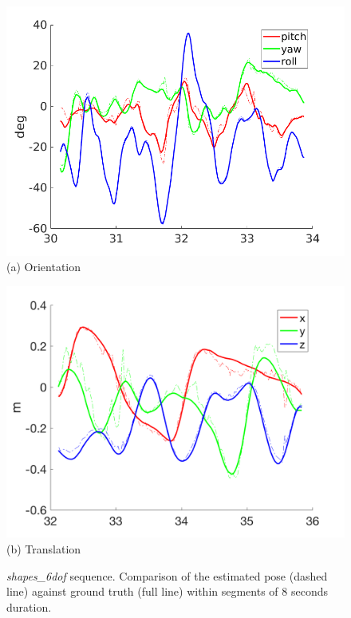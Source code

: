 \begin{figure}
  \begin{minipage}[t]{0.48\textwidth}
    \centering \includegraphics[width =
    \textwidth]{images/shapes_6dof_rotation_33.png} (a) Orientation
  \end{minipage}
  \hfill
  \begin{minipage}[t]{0.48\textwidth}
    \centering \includegraphics[width =
    \textwidth]{images/shapes_6dof_translation_33.png} (b) Translation
  \end{minipage}
  \hfill
  \caption{\textit{shapes\_6dof} sequence. Comparison of the estimated
    pose (dashed line) against ground truth (full line) within
    segments of 8 seconds duration.}
  \label{fig:shapes_6dof_pose_zoomed}
\end{figure}
